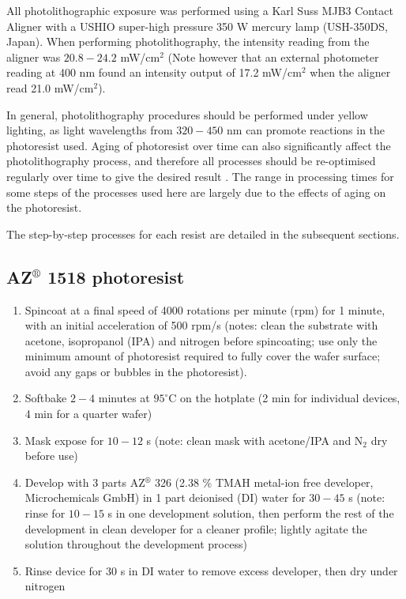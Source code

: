 \documentclass[
  a4paper,
]{scrbook}
\begin{document}
All photolithographic exposure was performed using a Karl Suss MJB3
Contact Aligner with a USHIO super-high pressure 350 W mercury lamp
(USH-350DS, Japan). When performing photolithography, the intensity
reading from the aligner was \(20.8-24.2\) mW/cm\(^2\) (Note however
that an external photometer reading at 400 nm found an intensity output
of 17.2 mW/cm\(^2\) when the aligner read 21.0 mW/cm\(^2\)).

In general, photolithography procedures should be performed under yellow
lighting, as light wavelengths from \(320-450\) nm can promote reactions
in the photoresist used. Aging of photoresist over time can also
significantly affect the photolithography process, and therefore all
processes should be re-optimised regularly over time to give the desired
result \autocite{Microchemicals}. The range in processing times for some
steps of the processes used here are largely due to the effects of aging
on the photoresist.

The step-by-step processes for each resist are detailed in the
subsequent sections.

\hypertarget{azcircledr-1518-photoresist}{%
\subsection{\texorpdfstring{AZ\(^\circledR\) 1518
photoresist}{AZ\^{}\textbackslash circledR 1518 photoresist}}\label{azcircledr-1518-photoresist}}

\begin{enumerate}
\def\labelenumi{\arabic{enumi}.}
\item
  Spincoat at a final speed of 4000 rotations per minute (rpm) for 1
  minute, with an initial acceleration of 500 rpm/s (notes: clean the
  substrate with acetone, isopropanol (IPA) and nitrogen before
  spincoating; use only the minimum amount of photoresist required to
  fully cover the wafer surface; avoid any gaps or bubbles in the
  photoresist).
\item
  Softbake \(2-4\) minutes at \(95^\circ\)C on the hotplate (2 min for
  individual devices, 4 min for a quarter wafer)
\item
  Mask expose for \(10-12\) s (note: clean mask with acetone/IPA and
  N\(_2\) dry before use)
\item
  Develop with 3 parts AZ\(^\circledR\) 326 (2.38 \% TMAH metal-ion free
  developer, Microchemicals GmbH) in 1 part deionised (DI) water for
  \(30-45\) s (note: rinse for \(10-15\) s in one development solution,
  then perform the rest of the development in clean developer for a
  cleaner profile; lightly agitate the solution throughout the
  development process)
\item
  Rinse device for 30 s in DI water to remove excess developer, then dry
  under nitrogen
\end{enumerate}
\end{document}
